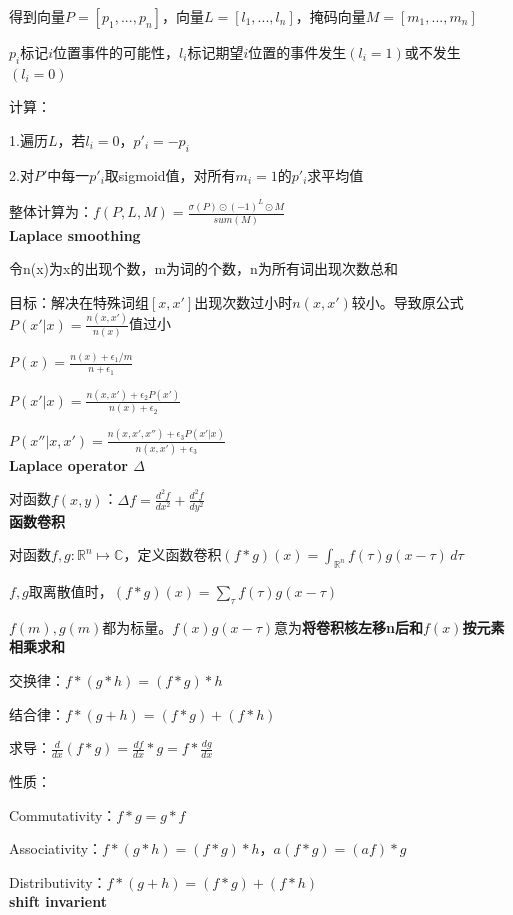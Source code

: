 \documentclass[UTF8]{ctexart}
\begin{document}
  得到向量$P = [p_1, ..., p_n]$，向量$L = [l_1, ..., l_n]$，掩码向量$M = [m_1, ..., m_n]$

  \quad $p_i$标记$i$位置事件的可能性，$l_i$标记期望$i$位置的事件发生$(l_i = 1)$或不发生$(l_i = 0)$

  计算：

  \quad 1.遍历$L$，若$l_i = 0$，$p'_i = -p_i$

  \quad 2.对$P'$中每一$p'_i$取sigmoid值，对所有$m_i = 1$的$p'_i$求平均值

  整体计算为：$f(P, L, M) = \frac{\sigma(P) \odot (-1)^L \odot M}{sum(M)}$\\
\textbf{Laplace smoothing}

  令n(x)为x的出现个数，m为词的个数，n为所有词出现次数总和
  
  \quad 目标：解决在特殊词组$[x, x']$出现次数过小时$n(x, x')$较小。导致原公式$P(x' | x) = \frac{n(x, x')}{n(x)}$值过小
    
  $P(x) = \frac{n(x) + \epsilon_1 / m}{n + \epsilon_1}$

  $P(x' | x) = \frac{n(x, x') + \epsilon_2 P(x')}{n(x) + \epsilon_2}$

  $P(x'' | x, x') = \frac{n(x, x', x'') + \epsilon_3 P(x' | x)}{n(x, x') + \epsilon_3}$\\
\textbf{Laplace operator $\Delta$}

  对函数$f(x, y)$：$\Delta f = \frac{d^2f}{dx^2} + \frac{d^2f}{dy^2}$\\
\textbf{函数卷积}

  对函数$f, g : \mathbb{R}^n \mapsto \mathbb{C}$，定义函数卷积$(f * g)(x) = \int_{\mathbb{R}^n} f(\tau)g(x - \tau) \,d\tau$

  \quad $f, g$取离散值时，$(f * g)(x) = \sum_\tau f(\tau)g(x - \tau)$

  \quad $f(m), g(m)$都为标量。$f(x)g(x - \tau)$意为\textbf{将卷积核左移n后和$f(x)$按元素相乘求和}

  交换律：$f * (g * h) = (f * g) * h$
  
  结合律：$f * (g + h) = (f * g) + (f * h)$

  求导：$\frac{d }{dx}(f * g) = \frac{d f}{dx} * g = f * \frac{dg}{dx}$
  
  性质：

  \quad Commutativity：$f * g = g * f$
  
  \quad Associativity：$f * (g * h) = (f * g) * h$，$a(f * g) = (af) * g$
  
  \quad Distributivity：$f * (g + h) = (f * g) + (f * h)$\\
\textbf{shift invarient}
\end{document}
